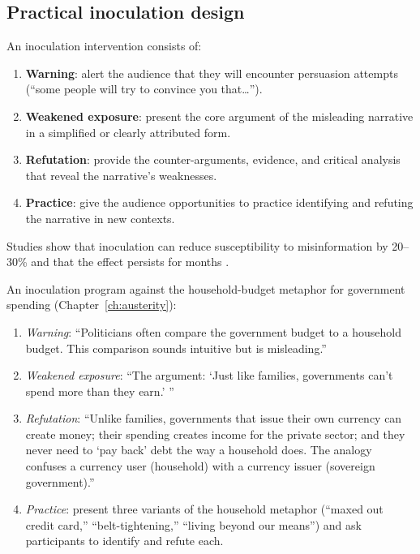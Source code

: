 \subsection{Practical inoculation design}

\begin{model}
\label{mod:inoculation-program}
An inoculation intervention consists of:
\begin{enumerate}[nosep]
  \item \textbf{Warning}: alert the audience that they will encounter persuasion attempts (``some people will try to convince you that\ldots'').
  \item \textbf{Weakened exposure}: present the core argument of the misleading narrative in a simplified or clearly attributed form.
  \item \textbf{Refutation}: provide the counter-arguments, evidence, and critical analysis that reveal the narrative's weaknesses.
  \item \textbf{Practice}: give the audience opportunities to practice identifying and refuting the narrative in new contexts.
\end{enumerate}
Studies show that inoculation can reduce susceptibility to misinformation by 20--30\% and that the effect persists for months \autocite{vanderlinden2022}.
\end{model}

\begin{example}
\label{ex:inoculation}
An inoculation program against the household-budget metaphor for government spending (Chapter~\ref{ch:austerity}):
\begin{enumerate}[nosep]
  \item \emph{Warning}: ``Politicians often compare the government budget to a household budget. This comparison sounds intuitive but is misleading.''
  \item \emph{Weakened exposure}: ``The argument: `Just like families, governments can't spend more than they earn.' ''
  \item \emph{Refutation}: ``Unlike families, governments that issue their own currency can create money; their spending creates income for the private sector; and they never need to `pay back' debt the way a household does. The analogy confuses a currency user (household) with a currency issuer (sovereign government).''
  \item \emph{Practice}: present three variants of the household metaphor (``maxed out credit card,'' ``belt-tightening,'' ``living beyond our means'') and ask participants to identify and refute each.
\end{enumerate}
\end{example}

